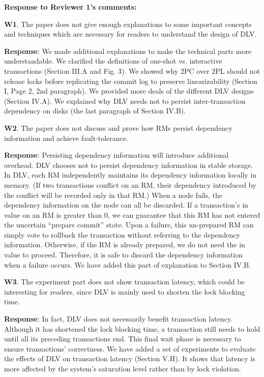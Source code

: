 \documentclass[conference]{IEEEtran}
\begin{document}
\begin{frame}{\relax}
  \textbf{Response to Reviewer 1’s comments:}

\textbf{W1}. The paper does not give enough explanations to some important concepts and techniques which are necessary for readers to understand the design of DLV.

\textbf{Response}: We made additional explanations to make the technical parts more understandable. We clarified the definitions of one-shot vs. interactive transactions (Section III.A and Fig. 3). We showed why 2PC over 2PL should not release locks before replicating the commit log to preserve linearizability (Section I, Page 2, 2nd paragraph). We provided more deals of the different DLV designs (Section IV.A). We explained why DLV needs not to persist inter-transaction dependency on disks (the last paragraph of Section IV.B).

\textbf{W2}. The paper does not discuss and prove how RMs persist dependency information and achieve fault-tolerance.

\textbf{Response}: Persisting dependency information will introduce additional overhead. DLV chooses not to persist dependency information in stable storage. In DLV, each RM independently maintains its dependency information locally in memory. (If two transactions conflict on an RM, their dependency introduced by the conflict will be recorded only in that RM.) When a node fails, the dependency information on the node can all be discarded. If a transaction’s in value on an RM is greater than 0, we can guarantee that this RM has not entered the uncertain “prepare commit” state. Upon a failure, this un-prepared RM can simply vote to rollback the transaction without referring to the dependency information. Otherwise, if the RM is already prepared, we do not need the in value to proceed. Therefore, it is safe to discard the dependency information when a failure occurs. We have added this part of explanation to Section IV.B.

\textbf{W3}. The experiment part does not show transaction latency, which could be interesting for readers, since DLV is mainly used to shorten the lock blocking time.

\textbf{Response}: In fact, DLV does not necessarily benefit transaction latency. Although it has shortened the lock blocking time, a transaction still needs to hold until all its preceding transactions end. This final wait phase is necessary to ensure transactions' correctness. We have added a set of experiments to evaluate the effects of DLV on transaction latency (Section V.H). It shows that latency is more affected by the system's saturation level rather than by lock violation.


\end{frame}
\end{document}
